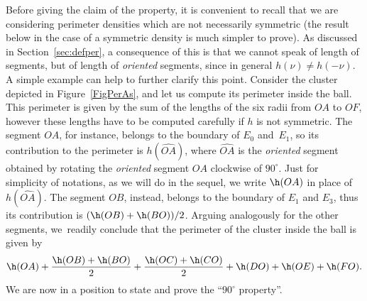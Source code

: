 Before giving the claim of the property, it is convenient to recall that we are considering perimeter densities which are not necessarily symmetric (the result below in the case of a symmetric density is much simpler to prove). As discussed in Section~\ref{sec:defper}, a consequence of this is that we cannot speak of length of segments, but of length of \emph{oriented} segments, since in general $h(\nu)\neq h(-\nu)$. A simple example can help to further clarify this point. Consider the cluster depicted in Figure~\ref{FigPerAs}, and let us compute its perimeter inside the ball. This perimeter is given by the sum of the lengths of the six radii from $OA$ to $OF$, however these lengths have to be computed carefully if $h$ is not symmetric. The segment $OA$, for instance, belongs to the boundary of $E_0$ and~$E_1$, so its contribution to the perimeter is $h(\widehat{OA})$, where $\widehat{OA}$ is the \emph{oriented} segment obtained by rotating the \emph{oriented} segment $OA$ clockwise of $90^\circ$. Just for simplicity of notations, as we will do in the sequel, we write $\h(OA)$ in place of $h(\widehat{OA})$. The segment $OB$, instead, belongs to the boundary of $E_1$ and $E_3$, thus its contribution is $(\h(OB)+\h(BO))/2$. Arguing analogously for the other segments, we~readily conclude that the perimeter of the cluster inside the ball is given by
\[
\h(OA) + \frac{\h(OB)+\h(BO)}2 + \frac{\h(OC)+\h(CO)}2 + \h(DO) + \h(OE) + \h(FO).
\]
We are now in a position to state and prove the ``$90^\circ$ property''.
